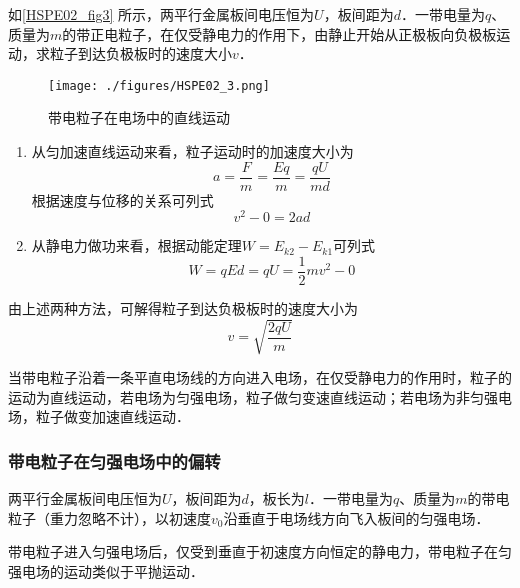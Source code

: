 \begin{example}{}
如\autoref{HSPE02_fig3} 所示，两平行金属板间电压恒为$U$，板间距为$d$．一带电量为$q$、质量为$m$的带正电粒子，在仅受静电力的作用下，由静止开始从正极板向负极板运动，求粒子到达负极板时的速度大小$v$．

\begin{figure}[ht]
\centering
\texttt{[image: ./figures/HSPE02\_3.png]}
\caption{带电粒子在电场中的直线运动} \label{HSPE02_fig3}
\end{figure}

\begin{enumerate}
\item 从匀加速直线运动来看，粒子运动时的加速度大小为
\begin{equation}
a = \frac{F}{m} = \frac{Eq}{m} = \frac{qU}{md}
\end{equation}
根据速度与位移的关系可列式
\begin{equation}
v^2 - 0 = 2ad
\end{equation}

\item 从静电力做功来看，根据动能定理$W=E_{k2}-E_{k1}$可列式
\begin{equation}
W=qEd=qU=\frac12 mv^2 - 0
\end{equation}
\end{enumerate}

由上述两种方法，可解得粒子到达负极板时的速度大小为
\begin{equation}\label{HSPE02_eq2}
v = \sqrt{\frac{2qU}{m}}
\end{equation}

\end{example}

当带电粒子沿着一条平直电场线的方向进入电场，在仅受静电力的作用时，粒子的运动为直线运动，若电场为匀强电场，粒子做匀变速直线运动；若电场为非匀强电场，粒子做变加速直线运动．

\subsubsection{带电粒子在匀强电场中的偏转}

两平行金属板间电压恒为$U$，板间距为$d$，板长为$l$．一带电量为$q$、质量为$m$的带电粒子（重力忽略不计），以初速度$v_0$沿垂直于电场线方向飞入板间的匀强电场．

带电粒子进入匀强电场后，仅受到垂直于初速度方向恒定的静电力，带电粒子在匀强电场的运动类似于平抛运动．

